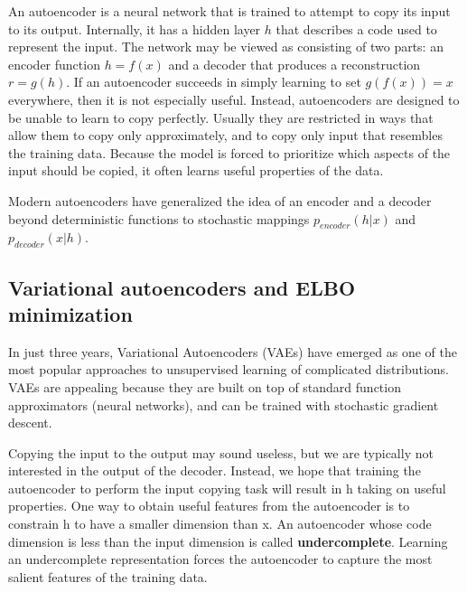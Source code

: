 An autoencoder is a neural network that is trained to attempt to copy its input to its output. Internally, it has a hidden layer $h$ that describes a code used to represent the input. The network may be viewed as consisting of two parts: an encoder function $h=f(x)$ and a decoder that produces a reconstruction $r=g(h)$. If an autoencoder succeeds in simply learning to set $g(f(x))=x$ everywhere, then it is not especially useful. Instead, autoencoders are designed to be unable to learn to copy perfectly. Usually they are restricted in ways that allow them to copy only approximately, and to copy only input that resembles the training data. Because the model is forced to prioritize which aspects of the input should be copied, it often learns useful properties of the data.
%




Modern autoencoders have generalized the idea of an encoder and a decoder beyond deterministic functions to stochastic mappings $p_{encoder}(h | x)$ and $p_{decoder}(x | h)$.


\subsection{Variational autoencoders and ELBO minimization}

In just three years, Variational Autoencoders (VAEs) have emerged as one of the most popular approaches to unsupervised learning of complicated distributions. VAEs are appealing because they are built on top of standard function approximators (neural networks), and can be trained with stochastic gradient descent.

Copying the input to the output may sound useless, but we are typically not interested in the output of the decoder. Instead, we hope that training the autoencoder to perform the input copying task will result in h taking on useful properties. One way to obtain useful features from the autoencoder is to constrain h to have a smaller dimension than x. An autoencoder whose code dimension is less than the input dimension is called \textbf{undercomplete}. Learning an undercomplete representation forces the autoencoder to capture the most salient features of the training data.




